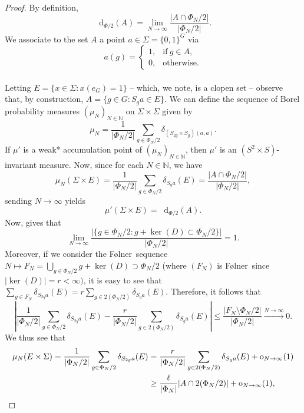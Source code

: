 \documentclass[reqno]{amsart}
\def\N{{\mathbb N}}
\newcommand*\diff{\mathop{}\!\mathrm{d}}
\theoremstyle{definition}
\theoremstyle{remark}
\theoremstyle{remark}
\def\N{{\mathbb N}}
\newcommand{\Folner}{F\o{}lner}
\newcommand{\oh}{{\rm o}}
\begin{document}
\begin{proof}

By definition, 
$$\diff_{\Phi/2}(A) = \lim_{N\to\infty}\frac{|A\cap\Phi_{N}/2|}{|\Phi_{N}/2|}.$$
We associate to the set $A$ a point $a\in\Sigma=\{0,1\}^G$ via 
$$a(g) = \begin{cases}
    1, & \text{if}~g\in A, \\
    0, & \text{otherwise}.
\end{cases}$$
\ \\
Letting $E=\{x\in\Sigma\colon x(e_G)=1\}$ -- which, we note, 
is a clopen set -- observe that, by 
construction, $A=\{g\in G\colon S_ga\in E\}$. We 
can define the sequence of Borel probability measures $(\mu_N)_{N\in \N}$ on 
$\Sigma\times\Sigma$ given by 
$$\mu_N = \frac{1}{|\Phi_{N}/2|}\sum_{g\in \Phi_{N}/2}\delta_{(S_{2g}\times S_g)(a,a)}.$$
If $\mu'$ is a weak* accumulation point of $(\mu_N)_{N\in \N}$, then $\mu'$ is an $(S^2 \times S)$-invariant measure. Now, since for each $N\in \N$, we have
$$\mu_N(\Sigma\times E) = \frac{1}{|\Phi_{N}/2|}\sum_{g\in \Phi_{N}/2}\delta_{S_ga}(E) = \frac{| A\cap \Phi_N/2|}{|\Phi_{N}/2|},$$
sending $N\to\infty$ yields
\begin{equation}\label{dbound_eq1}
    \mu'(\Sigma\times E) = \diff_{\Phi/2}(A).
\end{equation}
Now, \cite[Lemma A.4]{charamaras_kousek_mountakis_radic2025BBingroups} gives that
$$ \lim_{N\to \infty} \frac{|\{g\in \Phi_N/2 : g+ \ker(D) \subset \Phi_N/2\} |}
    {|\Phi_N/2|}=1.$$
Moreover, if we consider the \Folner\ sequence $N\mapsto F_{N}=\bigcup_{g\in \Phi_{N}/2}
g+\ker(D) \supset \Phi_{N}/2$ (where $(F_N)$ is \Folner\ since $|\ker(D)|=r<\infty)$, it is easy to see that $\sum_{g\in F_{N}} \delta _{S_{2g}a} (E)= r 
\sum_{g\in 2 (\Phi_{N}/2)} \delta _{S_{g}a} (E)$. Therefore, it follows that
\begin{equation*}
    \left| \frac{1}{|\Phi_{N}/2|} \sum_{g\in \Phi_{N}/2} \delta _{S_{2g}a} (E) 
    - \frac{r}{|\Phi_{N}/2|} \sum_{g\in 2 (\Phi_{N}/2)} \delta _{S_{g}a} (E)
    \right| \leq 
    \frac{|F_{N} \setminus \Phi_{N}/2|}{|\Phi_{N}/2|}\xrightarrow[]{N\to \infty} 0.
\end{equation*}
We thus see that
\begin{align}\label{eq:3}
    \mu_N(E\times\Sigma) = \frac{1}{|\Phi_{N}/2|}
    \sum_{g\in\Phi_{N}/2}\delta_{S_{2g}a}(E)
    & = \frac{r}{|\Phi_{N}/2|}\sum_{g\in 2(\Phi_{N}/2)}\delta_{S_ga}(E) + \oh_{N\to\infty}(1) \notag \\
    & \geq \frac{\ell}{|\Phi_{N}|}|A\cap 2(\Phi_{N}/2)|+ \oh_{N\to\infty}(1),

\end{align}
\end{proof}
\end{document}

